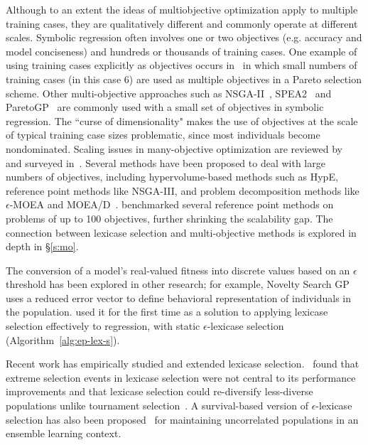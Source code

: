 \documentclass[twoside]{article}
\newcommand{\edit}[1]{{\color{red} #1}}
\begin{document}
Although to an extent the ideas of multiobjective optimization apply to multiple training cases, they are qualitatively different and commonly operate at different scales. Symbolic regression often involves one or two objectives (e.g. accuracy and model conciseness) and hundreds or thousands of training cases. One example of using training cases explicitly as objectives occurs in~\cite{langdon_evolving_1995} in which small numbers of training cases (in this case 6) are used as multiple objectives in a Pareto selection scheme. Other multi-objective approaches such as NSGA-II~\citep{schoenauer_fast_2000}, SPEA2~\citep{zitzler_spea2:_2001} and ParetoGP~\citep{smits_pareto-front_2005} are commonly used with a small set of objectives in symbolic regression. \edit{The ``curse of dimensionality" makes the use of objectives at the scale of typical training case sizes problematic, since most individuals become nondominated. Scaling issues in many-objective optimization are reviewed by~\cite{ishibuchi_evolutionary_2008} and surveyed in~\cite{li_many-objective_2015}. Several methods have been proposed to deal with large numbers of objectives, including hypervolume-based methods such as HypE, reference point methods like NSGA-III, and problem decomposition methods like $\epsilon$-MOEA and MOEA/D~\citep{chand_evolutionary_2015}. \cite{li_empirical_2017} benchmarked several reference point methods on problems of up to 100 objectives, further shrinking the scalability gap.} The connection between lexicase selection and multi-objective methods is explored in depth in \S\ref{s:mo}.

The conversion of a model's real-valued fitness into discrete values based on an $\epsilon$ threshold has been explored in other research; for example, Novelty Search GP~\citep{martinez_searching_2013} uses a reduced error vector to define behavioral representation of individuals in the population. \cite{la_cava_epsilon-lexicase_2016} used it for the first time as a solution to applying lexicase selection effectively to regression, with static $\epsilon$-lexicase selection (Algorithm~\ref{alg:ep-lex-s}).

Recent work has empirically studied and extended lexicase selection.~\cite{helmuth_impact_2016} found that extreme selection events in lexicase selection were not central to its performance improvements and that lexicase selection could re-diversify less-diverse populations unlike tournament selection~\citep{helmuth_effects_2016}. A survival-based version of $\epsilon$-lexicase selection has also been proposed~\citep{la_cava_general_2017,la_cava_ensemble_2017} for maintaining uncorrelated populations in an ensemble learning context. 
\end{document}
